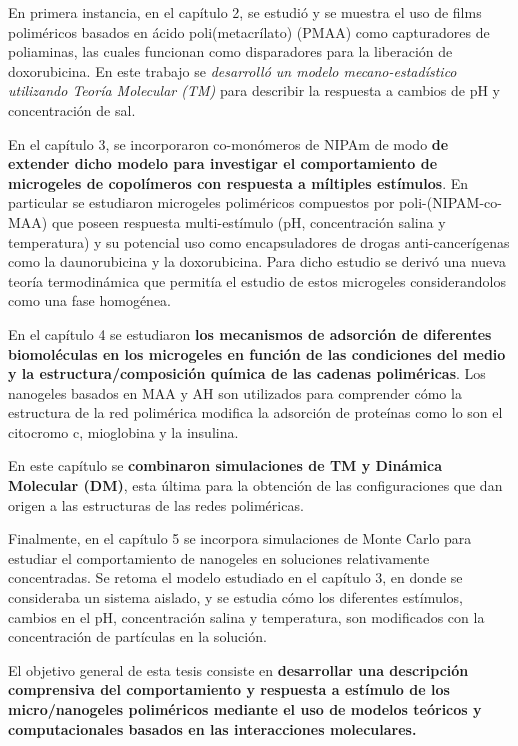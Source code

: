 En primera instancia, en el cap\'itulo 2, se estudi\'o y se muestra el uso de films polim\'ericos basados en \'acido poli(metacr\'ilato) (PMAA) como capturadores de poliaminas, las cuales funcionan como disparadores para la liberaci\'on de doxorubicina. En este trabajo se \textit{desarroll\'o un modelo mecano-estad\'istico utilizando Teor\'ia Molecular (TM)} para describir la respuesta a cambios de pH y concentraci\'on de sal.

En el cap\'itulo 3, se incorporaron co-mon\'omeros de NIPAm de modo \textbf{de extender dicho modelo para investigar el comportamiento de microgeles de copol\'imeros con respuesta a m\'iltiples est\'imulos}. En particular se estudiaron microgeles polim\'ericos compuestos por poli-(NIPAM-co-MAA) que poseen respuesta multi-est\'imulo (pH, concentraci\'on salina y temperatura) y su potencial uso como encapsuladores de drogas anti-cancer\'igenas como la daunorubicina y la doxorubicina.
Para dicho estudio se deriv\'o una nueva teor\'ia termodin\'amica que permit\'ia el estudio de estos microgeles considerandolos como una fase homog\'enea.

En el cap\'itulo 4 se estudiaron \textbf{los mecanismos de adsorci\'on de diferentes biomol\'eculas en los microgeles en funci\'on de las condiciones del medio y la estructura/composici\'on qu\'imica de las cadenas polim\'ericas}. Los nanogeles basados en MAA y AH son utilizados para comprender c\'omo la estructura de la red polim\'erica modifica la adsorci\'on de prote\'inas como lo son el citocromo c, mioglobina y la insulina.

En este cap\'itulo se \textbf{combinaron simulaciones de TM y Din\'amica Molecular (DM)}, esta \'ultima para la obtenci\'on de las configuraciones que dan origen a las estructuras de las redes polim\'ericas.

Finalmente, en el cap\'itulo 5 se incorpora simulaciones de Monte Carlo para estudiar el comportamiento de nanogeles en soluciones relativamente concentradas. Se retoma el modelo estudiado en el cap\'itulo 3, en donde se consideraba un sistema aislado, y se estudia c\'omo los diferentes est\'imulos, cambios en el pH, concentraci\'on salina y temperatura, son modificados con la concentraci\'on de part\'iculas en la soluci\'on.

El objetivo general de esta tesis consiste en \textbf{desarrollar una descripci\'on comprensiva del comportamiento y respuesta a est\'imulo de los micro/nanogeles polim\'ericos mediante el uso de modelos te\'oricos y computacionales basados en las interacciones moleculares.}


